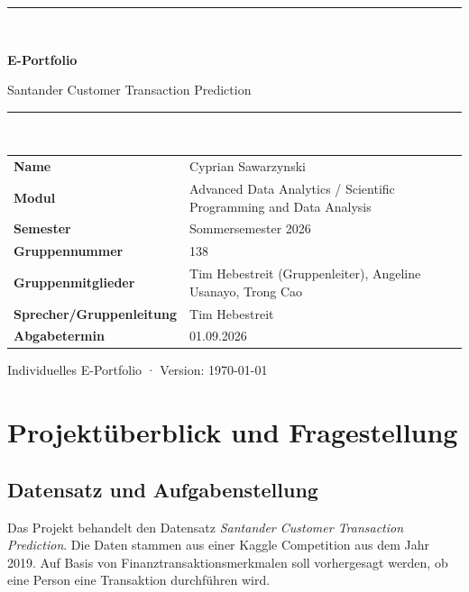 \documentclass[11pt,a4paper]{article}
\begin{document}
\begin{titlepage}
  \centering
  \vspace*{2.2cm}
  {\color{ADAblue}\rule{\textwidth}{1.5pt}}\\[1.2cm]
  {\Huge\bfseries\color{ADAblue} E-Portfolio\par}
  \vspace{0.5cm}
  {\LARGE Santander Customer Transaction Prediction\par}
  \vspace{1.4cm}
  {\color{ADAgold}\rule{0.35\textwidth}{2pt}}\\[1.4cm]

  \begin{tabular}{>{\bfseries}p{}p{}}
    Name & Cyprian Sawarzynski \\
    Modul & Advanced Data Analytics / Scientific Programming and Data Analysis \\
    Semester & Sommersemester 2026 \\
    Gruppennummer & 138 \\
    Gruppenmitglieder & Tim Hebestreit (Gruppenleiter), Angeline Usanayo, Trong Cao \\
    Sprecher/Gruppenleitung & Tim Hebestreit \\
    Abgabetermin & 01.09.2026 \\
  \end{tabular}

  \vfill
  {\small Individuelles E-Portfolio · Version: \today\par}
\end{titlepage}

\tableofcontents
\clearpage

\section{Projektüberblick und Fragestellung}

\subsection{Datensatz und Aufgabenstellung}
Das Projekt behandelt den Datensatz \emph{Santander Customer Transaction Prediction}. Die
Daten stammen aus einer Kaggle Competition aus dem Jahr 2019. Auf Basis von
Finanztransaktionsmerkmalen soll vorhergesagt werden, ob eine Person eine Transaktion
durchführen wird.
\end{document}
